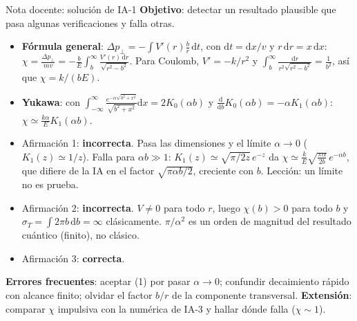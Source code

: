 \documentclass[aspectratio=169]{beamer}
\newif\ifdocente
\newcommand{\dd}{\mathrm{d}}
\begin{document}
\ifdocente
\begin{frame}{Nota docente: solución de IA-1}
\footnotesize
\textbf{Objetivo}: detectar un resultado plausible que pasa algunas verificaciones y falla otras.
\begin{itemize}
  \item \textbf{Fórmula general}: $\Delta p_\perp=-\int V'(r)\frac{b}{r}\,\dd t$, con
        $\dd t=\dd x/v$ y $r\,\dd r=x\,\dd x$:
        $\chi=\frac{\Delta p_\perp}{mv}=-\frac{b}{E}\int_b^\infty\frac{V'(r)\,\dd r}{\sqrt{r^2-b^2}}$.
        Para Coulomb, $V'=-k/r^2$ y $\int_b^\infty\frac{\dd r}{r^2\sqrt{r^2-b^2}}=\frac1{b^2}$,
        así que $\chi=k/(bE)$. \checkmark
  \item \textbf{Yukawa}: con $\int_{-\infty}^{\infty}\frac{e^{-\alpha\sqrt{b^2+x^2}}}{\sqrt{b^2+x^2}}\dd x=2K_0(\alpha b)$
        y $\frac{\dd}{\dd b}K_0(\alpha b)=-\alpha K_1(\alpha b)$:
        \quad $\boxed{\chi\simeq\frac{k\alpha}{E}K_1(\alpha b)}$.
  \item Afirmación 1: \textbf{incorrecta}. Pasa las dimensiones y el límite $\alpha\to0$
        ($K_1(z)\simeq1/z$). Falla para $\alpha b\gg1$: $K_1(z)\simeq\sqrt{\pi/2z}\,e^{-z}$
        da $\chi\simeq\frac kE\sqrt{\frac{\pi\alpha}{2b}}\,e^{-\alpha b}$, que difiere de la IA en
        el factor $\sqrt{\pi\alpha b/2}$, creciente con $b$. Lección: un límite no es prueba.
  \item Afirmación 2: \textbf{incorrecta}. $V\neq0$ para todo $r$, luego $\chi(b)>0$ para todo $b$
        y $\sigma_T=\int2\pi b\,\dd b=\infty$ clásicamente. $\pi/\alpha^2$ es un orden de magnitud
        del resultado cuántico (finito), no clásico.
  \item Afirmación 3: \textbf{correcta}.
\end{itemize}
\textbf{Errores frecuentes}: aceptar (1) por pasar $\alpha\to0$; confundir decaimiento rápido con
alcance finito; olvidar el factor $b/r$ de la componente transversal.
\textbf{Extensión}: comparar $\chi$ impulsiva con la numérica de IA-3 y hallar dónde falla ($\chi\sim1$).
\end{frame}
\end{document}
